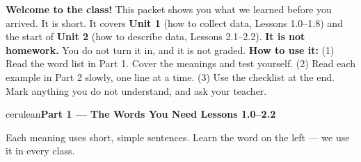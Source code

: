\documentclass[10pt]{article}
\newcommand{\parthead}[1]{%
  \vspace{6pt}\noindent
  \begin{headlinebox}{cerulean}{\color{white}\bfseries #1}\end{headlinebox}%
  \vspace{4pt}}
\begin{document}

\vspace{0.10in}
\begin{remindbox}
\small
\textbf{Welcome to the class!} This packet shows you what we learned before you arrived. It is
short. It covers \textbf{Unit 1} (how to collect data, Lessons 1.0--1.8) and the start of
\textbf{Unit 2} (how to describe data, Lessons 2.1--2.2).
\textbf{It is not homework.} You do not turn it in, and it is not graded.
\textbf{How to use it:} (1) Read the word list in Part 1. Cover the meanings and test yourself.
(2) Read each example in Part 2 slowly, one line at a time. (3) Use the checklist at the end.
Mark anything you do not understand, and ask your teacher.
\end{remindbox}

\parthead{Part 1 --- The Words You Need \hfill Lessons 1.0--2.2}

\small
Each meaning uses short, simple sentences. Learn the word on the left --- we use it in every class.
\end{document}
